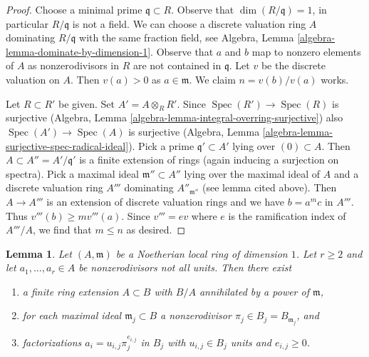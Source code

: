 \documentclass[10pt,a4paper]{amsart}
\theoremstyle{plain}
\newtheorem{lemma}[subsection]{Lemma}
\theoremstyle{definition}
\theoremstyle{remark}
\numberwithin{equation}{subsection}
\def\Spec{\mathop{\mathrm{Spec}}}
\begin{document}
\begin{proof}
Choose a minimal prime $\mathfrak q \subset R$. Observe that
$\dim(R/\mathfrak q) = 1$, in particular $R/\mathfrak q$ is not a field.
We can choose a discrete valuation ring $A$ dominating $R/\mathfrak q$
with the same fraction field, see
Algebra, Lemma \ref{algebra-lemma-dominate-by-dimension-1}. Observe that
$a$ and $b$ map to nonzero elements of $A$ as nonzerodivisors in $R$
are not contained in $\mathfrak q$. Let $v$ be the discrete valuation on $A$.
Then $v(a) > 0$ as $a \in \mathfrak m$.
We claim $n = v(b)/v(a)$ works.

\medskip\noindent
Let $R \subset R'$ be given. Set $A' = A \otimes_R R'$.
Since $\Spec(R') \to \Spec(R)$ is surjective
(Algebra, Lemma \ref{algebra-lemma-integral-overring-surjective})
also $\Spec(A') \to \Spec(A)$ is surjective
(Algebra, Lemma \ref{algebra-lemma-surjective-spec-radical-ideal}).
Pick a prime $\mathfrak q' \subset A'$ lying over $(0) \subset A$.
Then $A \subset A'' = A'/\mathfrak q'$ is a finite extension of rings
(again inducing a surjection on spectra).
Pick a maximal ideal $\mathfrak m'' \subset A''$
lying over the maximal ideal of $A$ and a discrete valuation ring
$A'''$ dominating $A''_{\mathfrak m''}$ (see lemma cited above).
Then $A \to A'''$ is an extension of discrete valuation rings
and we have $b = a^m c$ in $A'''$. Thus $v'''(b) \geq mv'''(a)$.
Since $v''' = ev$ where $e$ is the ramification index
of $A'''/A$, we find that $m \leq n$ as desired.
\end{proof}

\begin{lemma}
\label{lemma-prepare-tame-symbol}
Let $(A, \mathfrak m)$ be a Noetherian local ring of dimension $1$.
Let $r \geq 2$ and let $a_1, \ldots, a_r \in A$ be nonzerodivisors
not all units.
Then there exist
\begin{enumerate}
\item a finite ring extension $A \subset B$ with
$B/A$ annihilated by a power of $\mathfrak m$,
\item for each maximal ideal $\mathfrak m_j \subset B$
a nonzerodivisor $\pi_j \in B_j = B_{\mathfrak m_j}$, and
\item factorizations $a_i = u_{i, j} \pi_j^{e_{i, j}}$ in $B_j$
with $u_{i, j} \in B_j$ units and $e_{i, j} \geq 0$.
\end{enumerate}
\end{lemma}
\end{document}

